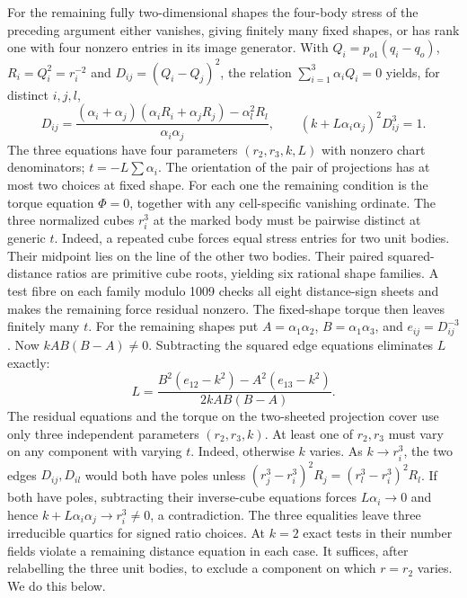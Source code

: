 \documentclass[11pt]{article}
\begin{document}
For the remaining fully two-dimensional shapes the four-body stress of the preceding argument either vanishes, giving finitely many fixed shapes, or has rank one with four nonzero entries in its image generator. With $Q_i=p_{o1}(q_i-q_o)$, $R_i=Q_i^2=r_i^{-2}$ and $D_{ij}=(Q_i-Q_j)^2$, the relation $\sum_{i=1}^3\alpha_i Q_i=0$ yields, for distinct $i,j,l$,
\[
 D_{ij}=\frac{(\alpha_i+\alpha_j)(\alpha_iR_i+\alpha_jR_j)-\alpha_l^2R_l}
                 {\alpha_i\alpha_j},
 \qquad (k+L\alpha_i\alpha_j)^2D_{ij}^3=1.
\]
The three equations have four parameters $(r_2,r_3,k,L)$ with nonzero chart denominators; $t=-L\sum\alpha_i$. The orientation of the pair of projections has at most two choices at fixed shape. For each one the remaining condition is the torque equation $\Phi=0$, together with any cell-specific vanishing ordinate. The three normalized cubes $r_i^3$ at the marked body must be pairwise distinct at generic $t$. Indeed, a repeated cube forces equal stress entries for two unit bodies. Their midpoint lies on the line of the other two bodies. Their paired squared-distance ratios are primitive cube roots, yielding six rational shape families. A test fibre on each family modulo 1009 checks all eight distance-sign sheets and makes the remaining force residual nonzero. The fixed-shape torque then leaves finitely many $t$. For the remaining shapes put $A=\alpha_1\alpha_2$, $B=\alpha_1\alpha_3$, and $e_{ij}=D_{ij}^{-3}$. Now $kAB(B-A)\ne0$. Subtracting the squared edge equations eliminates $L$ exactly:
\[
 L=\frac{B^2(e_{12}-k^2)-A^2(e_{13}-k^2)}{2kAB(B-A)}.
\]
The residual equations and the torque on the two-sheeted projection cover use only three independent parameters $(r_2,r_3,k)$. At least one of $r_2,r_3$ must vary on any component with varying $t$. Indeed, otherwise $k$ varies. As $k\to r_i^3$, the two edges $D_{ij},D_{il}$ would both have poles unless $(r_j^3-r_i^3)^2R_j=(r_l^3-r_i^3)^2R_l$. If both have poles, subtracting their inverse-cube equations forces $L\alpha_i\to0$ and hence $k+L\alpha_i\alpha_j\to r_i^3\ne0$, a contradiction. The three equalities leave three irreducible quartics for signed ratio choices. At $k=2$ exact tests in their number fields violate a remaining distance equation in each case. It suffices, after relabelling the three unit bodies, to exclude a component on which $r=r_2$ varies. We do this below.
\end{document}
